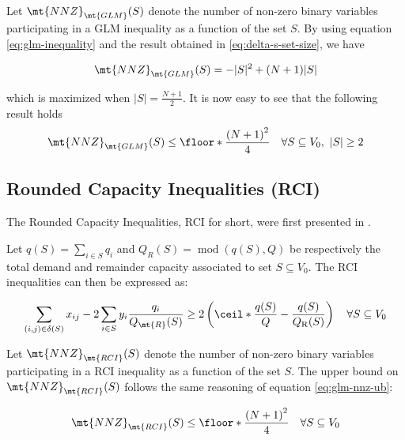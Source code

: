 Let $\mt{NNZ}_{\mt{GLM}}(S)$ denote the number of non-zero binary variables participating in a GLM inequality as a function of the set $S$.
By using equation \eqref{eq:glm-inequality} and the result obtained in \eqref{eq:delta-s-set-size}, we have

\begin{equation}
	\mt{NNZ}_{\mt{GLM}}(S) = -|S|^2 + (N + 1)|S|
\end{equation}

which is maximized when $|S| = \frac{N+1}{2}$.
It is now easy to see that the following result holds
\begin{equation}\label{eq:glm-nnz-ub}
	\mt{NNZ}_{\mt{GLM}}(S) \le \floor*{ \frac{\left( N + 1 \right)^2}{4}} \quad \forall S \subseteq V_0,\ |S| \ge 2
\end{equation}


\subsection{Rounded Capacity Inequalities (RCI)}
The Rounded Capacity Inequalities, RCI for short, were first presented in \cite{achuthan_capacitated_1998}.

Let $q(S) = \sum_{i \in S} q_i$ and $Q_{R}(S) = \mathop{mod}\left(q(S), Q \right)$ be respectively the total demand and remainder capacity associated to set $S \subseteq V_0$.
The RCI inequalities can then be expressed as:

\begin{equation}\label{eq:rci-inequality}
	\begin{split}
		\sum_{(i, j) \in \delta(S)} x_{ij} -2 \sum_{i \in S} y_i {\frac{q_i}{Q_\mt{R}(S)}}    \ge   2 \left( \ceil*{ \frac{q(S)}{Q}} - \frac{q(S)}{Q_{\mathrm{R}}(S)} \right) \quad \forall S \subseteq V_0
	\end{split}
\end{equation}

Let $\mt{NNZ}_{\mt{RCI}}(S)$ denote the number of non-zero binary variables participating in a RCI inequality as a function of the set $S$.
The upper bound on $\mt{NNZ}_{\mt{RCI}}(S)$ follows the same reasoning of equation \eqref{eq:glm-nnz-ub}:

\begin{equation}\label{eq:rc-nnz-ub}
	\mt{NNZ}_{\mt{RCI}}(S) \le \floor*{\frac{\left( N + 1\right)^2}{4}} \quad \forall S \subseteq V_0
\end{equation}
